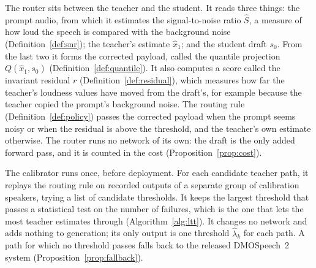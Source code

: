 The router sits between the teacher and the student. It reads three things: the prompt audio, from which it estimates the signal-to-noise ratio $\hat S$, a measure of how loud the speech is compared with the background noise (Definition~\ref{def:snr}); the teacher's estimate $\hat x_1$; and the student draft $s_0$. From the last two it forms the corrected payload, called the quantile projection $Q(\hat x_1,s_0)$ (Definition~\ref{def:quantile}). It also computes a score called the invariant residual $r$ (Definition~\ref{def:residual}), which measures how far the teacher's loudness values have moved from the draft's, for example because the teacher copied the prompt's background noise. The routing rule (Definition~\ref{def:policy}) passes the corrected payload when the prompt seems noisy or when the residual is above the threshold, and the teacher's own estimate otherwise. The router runs no network of its own: the draft is the only added forward pass, and it is counted in the cost (Proposition~\ref{prop:cost}).

The calibrator runs once, before deployment. For each candidate teacher path, it replays the routing rule on recorded outputs of a separate group of calibration speakers, trying a list of candidate thresholds. It keeps the largest threshold that passes a statistical test on the number of failures, which is the one that lets the most teacher estimates through (Algorithm~\ref{alg:ltt}). It changes no network and adds nothing to generation; its only output is one threshold $\hat\lambda_k$ for each path. A path for which no threshold passes falls back to the released DMOSpeech~2 system (Proposition~\ref{prop:fallback}).



